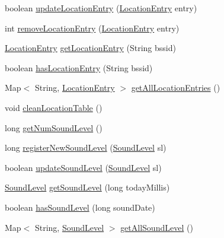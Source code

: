 \begin{DoxyCompactItemize}
\item 
boolean \hyperlink{classcs_1_1nsense_1_1db_1_1_n_sense_data_source_a9dcbabdf0890472efa3f20bd969150f8}{update\-Location\-Entry} (\hyperlink{classcs_1_1nsense_1_1location_1_1_location_entry}{Location\-Entry} entry)
\item 
int \hyperlink{classcs_1_1nsense_1_1db_1_1_n_sense_data_source_adfa41316811dba1c0df3c69a2f2497cd}{remove\-Location\-Entry} (\hyperlink{classcs_1_1nsense_1_1location_1_1_location_entry}{Location\-Entry} entry)
\item 
\hyperlink{classcs_1_1nsense_1_1location_1_1_location_entry}{Location\-Entry} \hyperlink{classcs_1_1nsense_1_1db_1_1_n_sense_data_source_a0952421ab22ba1c1cdaae78f1f1e9a73}{get\-Location\-Entry} (String bssid)
\item 
boolean \hyperlink{classcs_1_1nsense_1_1db_1_1_n_sense_data_source_aeed07265cae80dcd0370c75b6bff6b71}{has\-Location\-Entry} (String bssid)
\item 
Map$<$ String, \hyperlink{classcs_1_1nsense_1_1location_1_1_location_entry}{Location\-Entry} $>$ \hyperlink{classcs_1_1nsense_1_1db_1_1_n_sense_data_source_a8c368e8601a5921d392fb5df86b7f9ce}{get\-All\-Location\-Entries} ()
\item 
void \hyperlink{classcs_1_1nsense_1_1db_1_1_n_sense_data_source_aff6302a2c3056069b4f23dc2cb27afb8}{clean\-Location\-Table} ()
\item 
long \hyperlink{classcs_1_1nsense_1_1db_1_1_n_sense_data_source_a19e1c6afdcbae09b9b3cebd360e0328b}{get\-Num\-Sound\-Level} ()
\item 
long \hyperlink{classcs_1_1nsense_1_1db_1_1_n_sense_data_source_a3c995ff2da0aea4708800bd794aa3b4a}{register\-New\-Sound\-Level} (\hyperlink{classcs_1_1nsense_1_1microphone_1_1_sound_level}{Sound\-Level} sl)
\item 
boolean \hyperlink{classcs_1_1nsense_1_1db_1_1_n_sense_data_source_af3c5865b87b67329392eeac4a2fc3ffe}{update\-Sound\-Level} (\hyperlink{classcs_1_1nsense_1_1microphone_1_1_sound_level}{Sound\-Level} sl)
\item 
\hyperlink{classcs_1_1nsense_1_1microphone_1_1_sound_level}{Sound\-Level} \hyperlink{classcs_1_1nsense_1_1db_1_1_n_sense_data_source_a1e6613c5b6348d8b4e0b0e9eab863663}{get\-Sound\-Level} (long today\-Millis)
\item 
boolean \hyperlink{classcs_1_1nsense_1_1db_1_1_n_sense_data_source_ad4b30a67eb5bb1bde9328a66ee35b3a5}{has\-Sound\-Level} (long sound\-Date)
\item 
Map$<$ String, \hyperlink{classcs_1_1nsense_1_1microphone_1_1_sound_level}{Sound\-Level} $>$ \hyperlink{classcs_1_1nsense_1_1db_1_1_n_sense_data_source_ae32f33139be2813ca31c9fa712a687dc}{get\-All\-Sound\-Level} ()
\end{DoxyCompactItemize}
